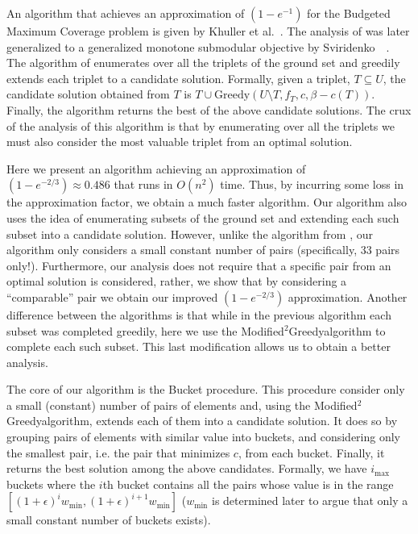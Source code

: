 \def\pLarge{P_{\text{large}}}
\def\pVal{P_{\text{val}}}
\def\MGreedy{Modified$^2$Greedy}
\def\BOTAlg{BestOfThree}

An algorithm that achieves an approximation of $(1-e^{-1})$ for the Budgeted Maximum Coverage problem is given by Khuller et al.~\cite{khuller1999budgeted}.
The analysis of \cite{khuller1999budgeted} was later generalized to a generalized monotone submodular objective by Sviridenko~~\cite{sviridenko2004note}.
The algorithm of \cite{khuller1999budgeted,sviridenko2004note} enumerates over all the triplets of the ground set and greedily extends each triplet to a candidate solution.
Formally, given a triplet, $T \subseteq U$, the candidate solution obtained from $T$ is $T \cup \text{Greedy}(U \setminus T, f_T, c, \beta - c(T))$.
Finally, the algorithm returns the best of the above candidate solutions.
The crux of the analysis of this algorithm is that by enumerating over all the triplets we must also consider the most valuable triplet from an optimal solution.

Here we present an algorithm achieving an approximation of $(1-e^{-2/3}) \approx 0.486$ that runs in $O(n^2)$ time.
Thus, by incurring some loss in the approximation factor, we obtain a much faster algorithm.
Our algorithm also uses the idea of enumerating subsets of the ground set and extending each such subset into a candidate solution.
However, unlike the algorithm from \cite{khuller1999budgeted, sviridenko2004note}, our algorithm only considers a small constant number of pairs (specifically, 33 pairs only!).
Furthermore, our analysis does not require that a specific pair from an optimal solution is considered, rather, we show that by considering a ``comparable'' pair we obtain our improved $(1 - e^{-2/3})$ approximation.
Another difference between the algorithms is that while in the previous algorithm each subset was completed greedily, here we use the \MGreedy algorithm to complete each such subset.
This last modification allows us to obtain a better analysis.

The core of our algorithm is the Bucket procedure.
This procedure consider only a small (constant) number of pairs of elements and, using the \MGreedy algorithm, extends each of them into a candidate solution.
It does so by grouping pairs of elements with similar value into buckets,
and considering only the smallest pair, i.e. the pair that minimizes $c$, from each bucket. 
Finally, it returns the best solution among the above candidates.
Formally, we have $i_{\max}$ buckets where the $i$th bucket contains all the pairs whose value is in the range $[(1 + \epsilon)^i w_{\min}, (1 + \epsilon)^{i + 1} w_{\min}]$ ($w_{\min}$ is determined later to argue that only a small constant number of buckets exists).

